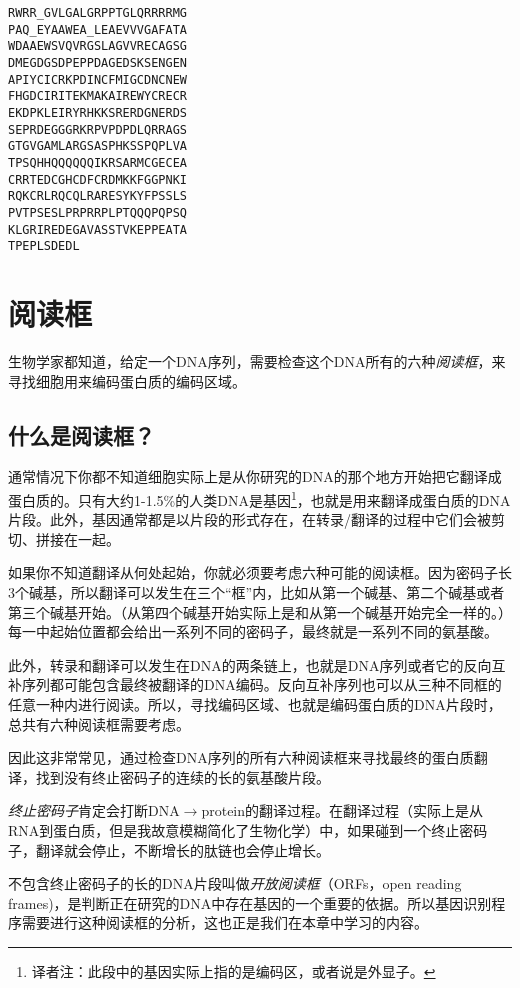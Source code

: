 \begin{lstlisting}
RWRR_GVLGALGRPPTGLQRRRRMG
PAQ_EYAAWEA_LEAEVVVGAFATA
WDAAEWSVQVRGSLAGVVRECAGSG
DMEGDGSDPEPPDAGEDSKSENGEN
APIYCICRKPDINCFMIGCDNCNEW
FHGDCIRITEKMAKAIREWYCRECR
EKDPKLEIRYRHKKSRERDGNERDS
SEPRDEGGGRKRPVPDPDLQRRAGS
GTGVGAMLARGSASPHKSSPQPLVA
TPSQHHQQQQQQIKRSARMCGECEA
CRRTEDCGHCDFCRDMKKFGGPNKI
RQKCRLRQCQLRARESYKYFPSSLS
PVTPSESLPRPRRPLPTQQQPQPSQ
KLGRIREDEGAVASSTVKEPPEATA
TPEPLSDEDL
\end{lstlisting}

\section{阅读框}
生物学家都知道，给定一个DNA序列，需要检查这个DNA所有的六种\textit{阅读框}，来寻找细胞用来编码蛋白质的编码区域。

\subsection{什么是阅读框？}
通常情况下你都不知道细胞实际上是从你研究的DNA的那个地方开始把它翻译成蛋白质的。只有大约1-1.5\%的人类DNA是基因\footnote{译者注：此段中的基因实际上指的是编码区，或者说是外显子。}，也就是用来翻译成蛋白质的DNA片段。此外，基因通常都是以片段的形式存在，在转录/翻译的过程中它们会被剪切、拼接在一起。

如果你不知道翻译从何处起始，你就必须要考虑六种可能的阅读框。因为密码子长3个碱基，所以翻译可以发生在三个“框”内，比如从第一个碱基、第二个碱基或者第三个碱基开始。（从第四个碱基开始实际上是和从第一个碱基开始完全一样的。）每一中起始位置都会给出一系列不同的密码子，最终就是一系列不同的氨基酸。

此外，转录和翻译可以发生在DNA的两条链上，也就是DNA序列或者它的反向互补序列都可能包含最终被翻译的DNA编码。反向互补序列也可以从三种不同框的任意一种内进行阅读。所以，寻找编码区域、也就是编码蛋白质的DNA片段时，总共有六种阅读框需要考虑。

因此这非常常见，通过检查DNA序列的所有六种阅读框来寻找最终的蛋白质翻译，找到没有终止密码子的连续的长的氨基酸片段。

\textit{终止密码子}肯定会打断DNA$\rightarrow$protein的翻译过程。在翻译过程（实际上是从RNA到蛋白质，但是我故意模糊简化了生物化学）中，如果碰到一个终止密码子，翻译就会停止，不断增长的肽链也会停止增长。

不包含终止密码子的长的DNA片段叫做\textit{开放阅读框}（ORFs，open reading
frames)，是判断正在研究的DNA中存在基因的一个重要的依据。所以基因识别程序需要进行这种阅读框的分析，这也正是我们在本章中学习的内容。

